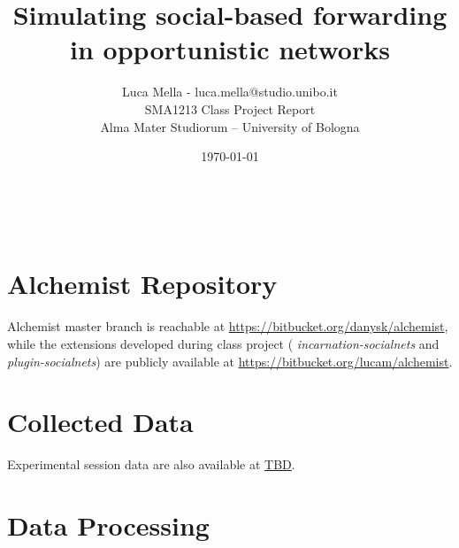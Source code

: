 \documentclass[a4paper]{article}
\begin{document}
\title{Simulating social-based forwarding in opportunistic networks}
\author{Luca Mella - luca.mella@studio.unibo.it \\ SMA1213 Class Project Report \\ Alma Mater Studiorum -- University of Bologna \\ }
\date{\today}

\maketitle


\sloppy



\newpage

\
\newpage


\newpage


\newpage


\newpage


\newpage
\nocite{*}
{}
 

\newpage
\appendix
\appendixpage 
\section{Alchemist Repository}
Alchemist master branch is reachable at \url{https://bitbucket.org/danysk/alchemist}, while the extensions developed during class project ( \emph{incarnation-socialnets} and \emph{plugin-socialnets}) are publicly available at \url{https://bitbucket.org/lucam/alchemist}.
\section{Collected Data}
Experimental session data are also available at \url{TBD}. 
\section{Data Processing}

\end{document}
